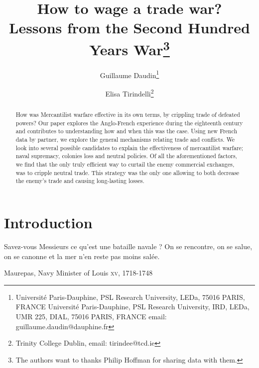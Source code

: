 \documentclass[12pt,a4paper,notitlepage,english]{article}
\author{
  Guillaume Daudin\thanks{Université Paris-Dauphine, PSL Research University, LEDa, 75016 PARIS, FRANCE Université Paris-Dauphine, PSL Research University, IRD, LEDa, UMR 225, DIAL, 75016 PARIS, FRANCE email: guillaume.daudin@dauphine.fr}
  \and
  Elisa Tirindelli\thanks{Trinity College Dublin, email: tirindee@tcd.ie}
}
\title{How to wage a trade war? \\ Lessons from the Second Hundred Years War\thanks{The authors want to thanks Philip Hoffman for sharing data with them.}}
\date{}
\begin{document}
\maketitle


\begin{abstract}
How was Mercantilist warfare effective in its own terms, by crippling trade of defeated powers? Our paper explores the Anglo-French experience during the eighteenth century and contributes to understanding how and when this was the case. Using new French data by partner, we explore the general mechanisms relating trade and conflicts. We look into several possible candidates to explain the effectiveness of mercantilist warfare; naval supremacy, colonies loss and neutral policies. Of all the aforementioned factors, we find that the only truly efficient way to curtail the enemy commercial exchanges, was to cripple neutral trade. This strategy was the only one allowing to both decrease the enemy's trade and causing long-lasting losses.
\end{abstract}


\section{Introduction} \label{introduction}

\epigraph{Savez-vous Messieurs ce qu’est une bataille navale ? On se rencontre, on se salue, on se canonne et la mer n’en reste pas moins salée.}{Maurepas, Navy Minister of Louis  \textsc{xv}, 1718-1748}



\maketitle
\end{document}
